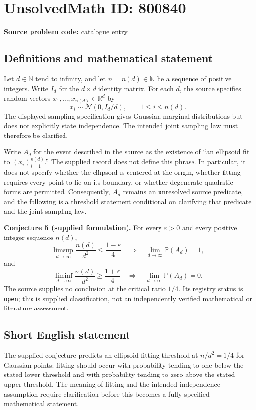 \documentclass[11pt]{article}
\newcommand{\N}{\mathbb{N}}
\newcommand{\R}{\mathbb{R}}
\begin{document}
\section*{UnsolvedMath ID: 800840}
\textbf{Source problem code:} catalogue entry
\subsection{Definitions and mathematical statement}
Let \(d\in\N\) tend to infinity, and let \(n=n(d)\in\N\) be a sequence of positive integers. Write \(I_d\) for the \(d\times d\) identity matrix. For each \(d\), the source specifies random vectors \(x_1,\ldots,x_{n(d)}\in\R^d\) by
\[
x_i\sim\mathcal N(0,I_d/d),\qquad 1\leq i\leq n(d).
\]
The displayed sampling specification gives Gaussian marginal distributions but does not explicitly state independence. The intended joint sampling law must therefore be clarified.

Write \(A_d\) for the event described in the source as the existence of ``an ellipsoid fit to \((x_i)_{i=1}^{n(d)}\).'' The supplied record does not define this phrase. In particular, it does not specify whether the ellipsoid is centered at the origin, whether fitting requires every point to lie on its boundary, or whether degenerate quadratic forms are permitted. Consequently, \(A_d\) remains an unresolved source predicate, and the following is a threshold statement conditional on clarifying that predicate and the joint sampling law.

\textbf{Conjecture 5 (supplied formulation).} For every \(\varepsilon>0\) and every positive integer sequence \(n(d)\),
\[
\limsup_{d\to\infty}\frac{n(d)}{d^2}\leq\frac{1-\varepsilon}{4}
\quad\Longrightarrow\quad
\lim_{d\to\infty}\mathbb P(A_d)=1,
\]
and
\[
\liminf_{d\to\infty}\frac{n(d)}{d^2}\geq\frac{1+\varepsilon}{4}
\quad\Longrightarrow\quad
\lim_{d\to\infty}\mathbb P(A_d)=0.
\]
The source supplies no conclusion at the critical ratio \(1/4\). Its registry status is \texttt{open}; this is supplied classification, not an independently verified mathematical or literature assessment.
\subsection{Short English statement}
The supplied conjecture predicts an ellipsoid-fitting threshold at \(n/d^2=1/4\) for Gaussian points: fitting should occur with probability tending to one below the stated lower threshold and with probability tending to zero above the stated upper threshold. The meaning of fitting and the intended independence assumption require clarification before this becomes a fully specified mathematical statement.
\end{document}
